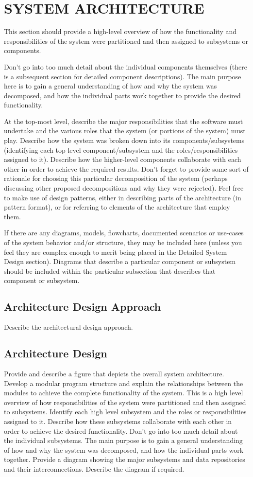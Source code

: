 \documentclass[12pt, a4paper]{report}
\begin{document}
\section{SYSTEM ARCHITECTURE}
This section should provide a high-level overview of how the functionality and
responsibilities of the system were partitioned and then assigned to subsystems or components.

Don't go into too much detail about the individual components themselves (there is a subsequent section for detailed component descriptions). The main purpose here is to gain a general understanding of how and why the system was decomposed, and how the individual parts work together to provide the desired functionality.

At the top-most level, describe the major responsibilities that the software must undertake and the various roles that the system (or portions of the system) must play. Describe how the system was broken down into its components/subsystems (identifying each top-level component/subsystem and the roles/responsibilities assigned to it). Describe how the higher-level components collaborate with each other in order to achieve the required results. Don't forget to provide some sort of rationale for choosing this particular decomposition of the system (perhaps discussing other proposed decompositions and why they were rejected). Feel free to make use of design patterns, either in describing parts of the architecture (in pattern format), or for referring to elements of the architecture that employ them.

If there are any diagrams, models, flowcharts, documented scenarios or use-cases of the system behavior and/or structure, they may be included here (unless you feel they are complex enough to merit being placed in the Detailed System Design section). Diagrams that describe a particular component or subsystem should be included within the particular subsection that describes that component or subsystem. 
\subsection{Architecture Design Approach}
Describe the architectural design approach. 
\subsection{Architecture Design}
Provide and describe a figure that depicts the overall system architecture. Develop a modular program structure and explain the relationships between the modules to achieve the complete functionality of the system. This is a high level overview of how responsibilities of the system were partitioned and then assigned to subsystems. Identify each high level subsystem and the roles or responsibilities assigned to it. Describe how these subsystems collaborate with each other in order to achieve the desired functionality. Don’t go into too much detail about the individual subsystems. The main purpose is to gain a general understanding of how and why the system was decomposed, and how the individual parts work together. Provide a diagram showing the major subsystems and data repositories and their interconnections. Describe the diagram if required. 
\end{document}
